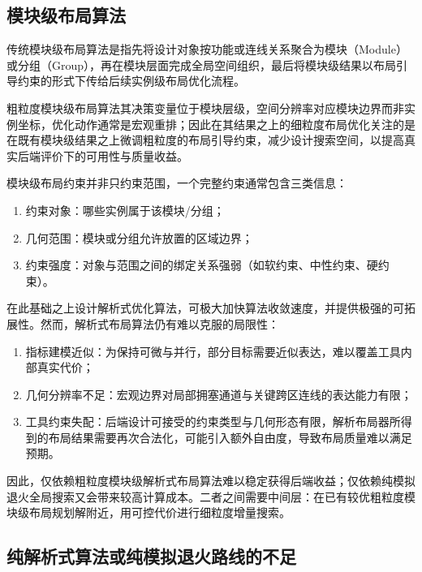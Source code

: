 
\subsection{模块级布局算法}
\label{sec:chap4-modular-placement}

传统模块级布局算法是指先将设计对象按功能或连线关系聚合为模块（Module）或分组（Group），再在模块层面完成全局空间组织，最后将模块级结果以布局引导约束的形式下传给后续实例级布局优化流程。

粗粒度模块级布局算法其决策变量位于模块层级，空间分辨率对应模块边界而非实例坐标，优化动作通常是宏观重排；因此在其结果之上的细粒度布局优化关注的是在既有模块级结果之上微调粗粒度的布局引导约束，减少设计搜索空间，以提高真实后端评价下的可用性与质量收益。

模块级布局约束并非只约束范围，一个完整约束通常包含三类信息：
\begin{enumerate}
    \item 约束对象：哪些实例属于该模块/分组；
    \item 几何范围：模块或分组允许放置的区域边界；
    \item 约束强度：对象与范围之间的绑定关系强弱（如软约束、中性约束、硬约束）。
\end{enumerate}
在此基础之上设计解析式优化算法，可极大加快算法收敛速度，并提供极强的可拓展性。然而，解析式布局算法仍有难以克服的局限性：
\begin{enumerate}
    \item 指标建模近似：为保持可微与并行，部分目标需要近似表达，难以覆盖工具内部真实代价；
    \item 几何分辨率不足：宏观边界对局部拥塞通道与关键跨区连线的表达能力有限；
    \item 工具约束失配：后端设计可接受的约束类型与几何形态有限，解析布局器所得到的布局结果需要再次合法化，可能引入额外自由度，导致布局质量难以满足预期。
\end{enumerate}



因此，仅依赖粗粒度模块级解析式布局算法难以稳定获得后端收益；仅依赖纯模拟退火全局搜索又会带来较高计算成本。二者之间需要中间层：在已有较优粗粒度模块级布局规划解附近，用可控代价进行细粒度增量搜索。

\subsection{纯解析式算法或纯模拟退火路线的不足}
\label{sec:chap4-two-extreme-routes}

